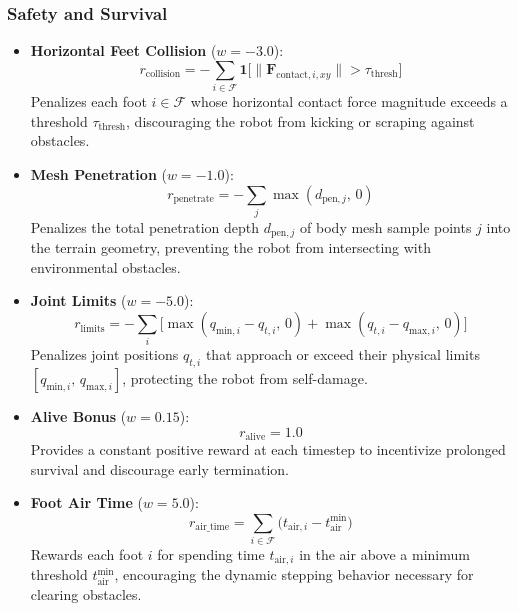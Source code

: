 \subsubsection*{Safety and Survival}
\begin{itemize}
    \item \textbf{Horizontal Feet Collision} ($w = -3.0$):
    \begin{equation}
        r_{\text{collision}} = -\sum_{i \in \mathcal{F}} \mathbf{1}\!\big[\|\mathbf{F}_{\text{contact},i,xy}\| > \tau_{\text{thresh}}\big]
    \end{equation}
    Penalizes each foot $i \in \mathcal{F}$ whose horizontal contact force magnitude exceeds a threshold $\tau_{\text{thresh}}$, discouraging the robot from kicking or scraping against obstacles.
    \item \textbf{Mesh Penetration} ($w = -1.0$):
    \begin{equation}
        r_{\text{penetrate}} = -\sum_{j} \max(d_{\text{pen},j},\,0)
    \end{equation}
    Penalizes the total penetration depth $d_{\text{pen},j}$ of body mesh sample points $j$ into the terrain geometry, preventing the robot from intersecting with environmental obstacles.
    \item \textbf{Joint Limits} ($w = -5.0$):
    \begin{equation}
        r_{\text{limits}} = -\sum_{i} \Big[\max(q_{\text{min},i} - q_{t,i},\,0) + \max(q_{t,i} - q_{\text{max},i},\,0)\Big]
    \end{equation}
    Penalizes joint positions $q_{t,i}$ that approach or exceed their physical limits $[q_{\text{min},i},\, q_{\text{max},i}]$, protecting the robot from self-damage.
    \item \textbf{Alive Bonus} ($w = 0.15$):
    \begin{equation}
        r_{\text{alive}} = 1.0
    \end{equation}
    Provides a constant positive reward at each timestep to incentivize prolonged survival and discourage early termination.
    \item \textbf{Foot Air Time} ($w = 5.0$):
    \begin{equation}
        r_{\text{air\_time}} = \sum_{i \in \mathcal{F}} \big(t_{\text{air},i} - t_{\text{air}}^{\text{min}}\big)
    \end{equation}
    Rewards each foot $i$ for spending time $t_{\text{air},i}$ in the air above a minimum threshold $t_{\text{air}}^{\text{min}}$, encouraging the dynamic stepping behavior necessary for clearing obstacles.
\end{itemize}

